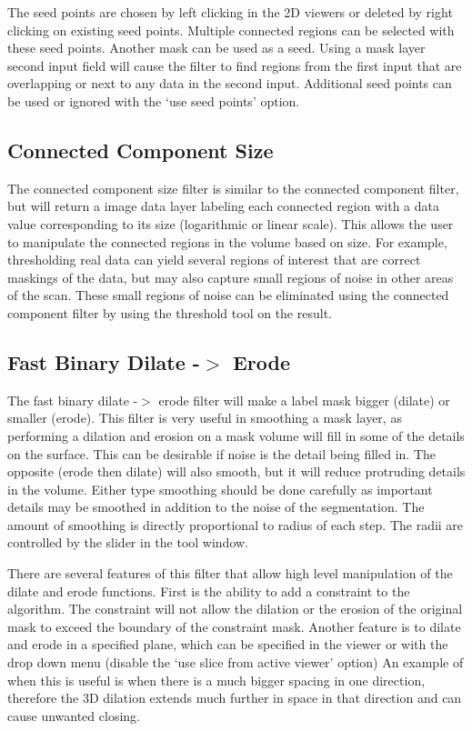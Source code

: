 \documentclass[fleqn,11pt,openany]{book}
\begin{document}
The seed points are chosen by left clicking in the 2D viewers or deleted by right clicking on existing seed points.  Multiple connected regions can be selected with these seed points.    Another mask can be used as a seed.  Using a mask layer second input field will  cause the filter to find regions from the first input that are overlapping or next to any data in the second input.  Additional seed points can be used or ignored with the `use seed points' option.  

\subsection{Connected Component Size}

The connected component size filter is similar to the connected component filter, but will return a image data layer labeling each connected region with a data value corresponding to its size (logarithmic or linear scale).  This allows the user to manipulate the connected regions in the volume based on size.  For example, thresholding real data can yield several regions of interest that are correct maskings of the data, but may also capture small regions of noise in other areas of the scan.  These small regions of noise can be eliminated using the connected component filter by using the threshold tool on the result.  

\subsection{Fast Binary Dilate -$>$ Erode}

The fast binary dilate -$>$ erode filter will make a label mask bigger (dilate) or smaller (erode).  This filter is very useful in smoothing a mask layer, as performing a dilation and erosion on a mask volume will fill in some of the details on the surface.  This can be desirable if noise is the detail being filled in.  The opposite (erode then dilate) will also smooth, but it will reduce protruding details in the volume.  Either type smoothing should be done carefully as important details may be smoothed in addition to the noise of the segmentation. The amount of smoothing is directly proportional to radius of each step.  The radii are controlled by the slider in the tool window.  

There are several features of this filter that allow high level manipulation of the dilate and erode functions.  First is the ability to add a constraint to the algorithm.  The constraint will not allow the dilation or the erosion of the original mask to exceed the boundary of the constraint mask.  Another feature is to dilate and erode in a specified plane, which can be specified in the viewer or with the drop down menu (disable the `use slice from active viewer' option)  An example of when this is useful is when there is a much bigger spacing in one direction, therefore the 3D dilation extends much further in space in that direction and can cause unwanted closing. 
\end{document}
